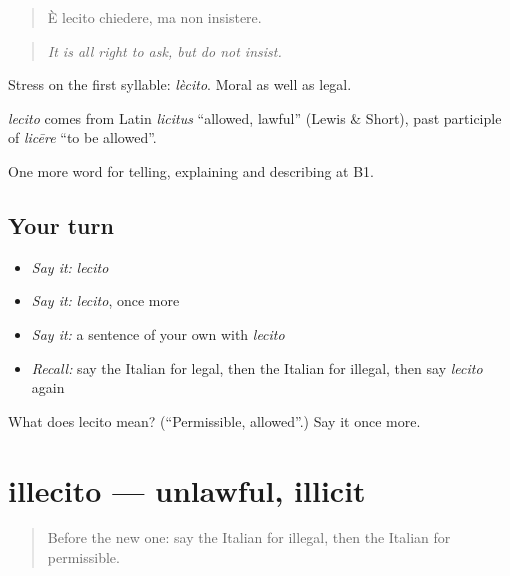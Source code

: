 \begin{quote}
È lecito chiedere, ma non insistere.
\end{quote}

\begin{quote}
\emph{It is all right to ask, but do not insist.}
\end{quote}

Stress on the first syllable: \emph{lècito}. Moral as well as legal.

\begin{cousinweb}
\emph{lecito} comes from Latin \emph{licitus} \textquotedblleft{}allowed, lawful\textquotedblright{} (Lewis \& Short), past participle of \emph{licēre} \textquotedblleft{}to be allowed\textquotedblright{}.
\end{cousinweb}

\begin{grammarlens}[title={What you've built}]
One more word for telling, explaining and describing at B1.
\end{grammarlens}

\subsection*{Your turn}
\begin{itemize}
\raggedright
  \item \emph{Say it:} \emph{lecito}
  \item \emph{Say it:} \emph{lecito}, once more
  \item \emph{Say it:} a sentence of your own with \emph{lecito}
  \item \emph{Recall:} say the Italian for legal, then the Italian for illegal, then say \emph{lecito} again
\end{itemize}

\begin{tcolorbox}[breakable,colback=teal!4,colframe=teal!35!black,title={Before you move on}]
What does lecito mean? (\textquotedblleft{}Permissible, allowed\textquotedblright{}.) Say it once more.
\end{tcolorbox}
\section[illecito]{illecito — unlawful, illicit}

\label{lesson:IT-C390-illecito}



\begin{quote}
Before the new one: say the Italian for illegal, then the Italian for permissible.
\end{quote}


